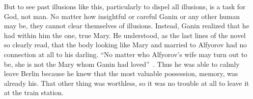 But to see past illusions like this, particularly to dispel all illusions, is a task for God, not man. 
No matter how insightful or careful Ganin or any other human may be, they cannot clear themselves of illusions.
Instead, Ganin realized that he had within him the one, true Mary. 
He understood, as the last lines of the novel so clearly read, that the body looking like Mary and married to Alfyorov had no connection at all to his darling.
``No matter who Alfyorov's wife may turn out to be, she is not the Mary whom Ganin had loved''~\cite{toker}.
Thus he was able to calmly leave Berlin because he knew that the most valuable possession, memory, was already his.
That other thing was worthless, so it was no trouble at all to leave it at the train station.



